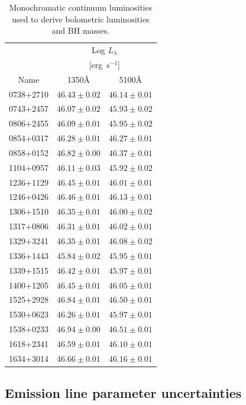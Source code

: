 \begin{table}
  \centering
  \caption{Monochromatic continuum luminosities used to derive bolometric luminosities and BH masses.}
  \label{tab:continuumproperties}
  \begin{tabular}{ccc}
  \hline
  & \multicolumn{2}{c}{Log $L_\lambda$} \\
  & \multicolumn{2}{c}{[erg~s$^{-1}$]} \\
  Name & 1350\AA & 5100\AA \\
  \hline
  0738+2710 & $46.43\pm0.02$ & $46.14\pm0.01$ \\
  0743+2457 & $46.07\pm0.02$ & $45.93\pm0.02$ \\
  0806+2455 & $46.09\pm0.01$ & $45.95\pm0.02$ \\
  0854+0317 & $46.28\pm0.01$ & $46.27\pm0.01$ \\
  0858+0152 & $46.82\pm0.00$ & $46.37\pm0.01$ \\
  1104+0957 & $46.11\pm0.03$ & $45.92\pm0.02$ \\
  1236+1129 & $46.45\pm0.01$ & $46.01\pm0.01$ \\
  1246+0426 & $46.46\pm0.01$ & $46.13\pm0.01$ \\
  1306+1510 & $46.35\pm0.01$ & $46.00\pm0.02$ \\
  1317+0806 & $46.31\pm0.01$ & $46.02\pm0.01$ \\
  1329+3241 & $46.35\pm0.01$ & $46.08\pm0.02$ \\
  1336+1443 & $45.84\pm0.02$ & $45.95\pm0.01$ \\
  1339+1515 & $46.42\pm0.01$ & $45.97\pm0.01$ \\
  1400+1205 & $46.45\pm0.01$ & $46.05\pm0.01$ \\
  1525+2928 & $46.84\pm0.01$ & $46.50\pm0.01$ \\
  1530+0623 & $46.26\pm0.01$ & $45.97\pm0.01$ \\
  1538+0233 & $46.94\pm0.00$ & $46.51\pm0.01$ \\
  1618+2341 & $46.59\pm0.01$ & $46.10\pm0.01$ \\
  1634+3014 & $46.66\pm0.01$ & $46.16\pm0.01$ \\
  \hline
  \end{tabular}
\end{table}

\subsection{Emission line parameter uncertainties}
\label{sec:param_uncertainties}


